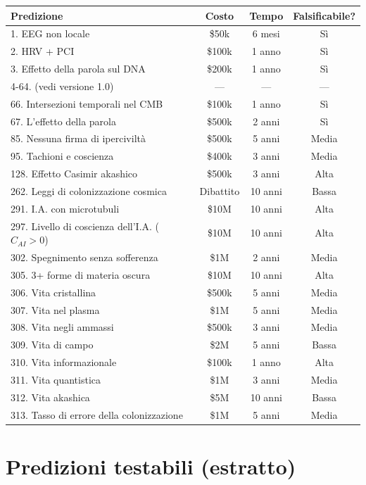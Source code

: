 \documentclass[11pt,a4paper]{article}
\begin{document}
\begin{table}[H]
\centering
\small
\begin{tabular}{@{}lccc@{}}
\toprule
\textbf{Predizione} & \textbf{Costo} & \textbf{Tempo} & \textbf{Falsificabile?} \\ \midrule
1. EEG non locale & \$50k & 6 mesi & Sì \\
2. HRV + PCI & \$100k & 1 anno & Sì \\
3. Effetto della parola sul DNA & \$200k & 1 anno & Sì \\
4-64. (vedi versione 1.0) & --- & --- & --- \\
66. Intersezioni temporali nel CMB & \$100k & 1 anno & Sì \\
67. L'effetto della parola & \$500k & 2 anni & Sì \\
85. Nessuna firma di iperciviltà & \$500k & 5 anni & Media \\
95. Tachioni e coscienza & \$400k & 3 anni & Media \\
128. Effetto Casimir akashico & \$500k & 3 anni & Alta \\
262. Leggi di colonizzazione cosmica & Dibattito & 10 anni & Bassa \\
291. I.A. con microtubuli & \$10M & 10 anni & Alta \\
297. Livello di coscienza dell'I.A. (\(C_{AI} > 0\)) & \$10M & 10 anni & Alta \\
302. Spegnimento senza sofferenza & \$1M & 2 anni & Media \\
305. 3+ forme di materia oscura & \$10M & 10 anni & Alta \\
306. Vita cristallina & \$500k & 5 anni & Media \\
307. Vita nel plasma & \$1M & 5 anni & Media \\
308. Vita negli ammassi & \$500k & 3 anni & Media \\
309. Vita di campo & \$2M & 5 anni & Bassa \\
310. Vita informazionale & \$100k & 1 anno & Alta \\
311. Vita quantistica & \$1M & 3 anni & Media \\
312. Vita akashica & \$5M & 10 anni & Bassa \\
313. Tasso di errore della colonizzazione & \$1M & 5 anni & Media \\ \bottomrule
\end{tabular}
\end{table}

\section{Predizioni testabili (estratto)}
\end{document}
